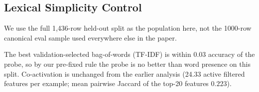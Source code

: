 \subsection{Lexical Simplicity Control}
\label{app:lexical}

We use the full 1{,}436-row held-out split as the population here, not
the 1000-row canonical eval sample used everywhere else in the paper.

\begin{table}[h]
\centering
\caption{Lexical simplicity control (held-out, $n=1{,}436$). Models are fit on train with regularisation chosen on validation. Diff.\ is probe minus baseline accuracy with a paired-bootstrap 95\% interval; $p$ is McNemar.}
\label{tab:app-lexical-simplicity}
\end{table}

The best validation-selected bag-of-words (TF-IDF) is within $0.03$ accuracy
of the probe, so by our pre-fixed rule the probe is no better than word
presence on this split. Co-activation is unchanged from the earlier analysis
(24.33 active filtered features per example; mean pairwise Jaccard of the
top-20 features $0.223$).

